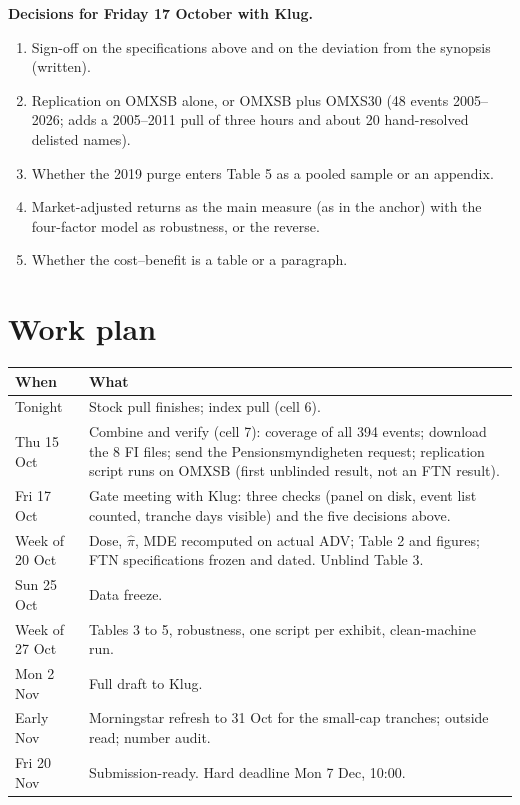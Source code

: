 \documentclass[11pt,a4paper]{article}
\begin{document}
\textbf{Decisions for Friday 17 October with Klug.}
\begin{enumerate}[nosep]
\item Sign-off on the specifications above and on the deviation from the synopsis (written).
\item Replication on OMXSB alone, or OMXSB plus OMXS30 (48 events 2005--2026; adds a 2005--2011 pull of three hours and about 20 hand-resolved delisted names).
\item Whether the 2019 purge enters Table 5 as a pooled sample or an appendix.
\item Market-adjusted returns as the main measure (as in the anchor) with the four-factor model as robustness, or the reverse.
\item Whether the cost--benefit is a table or a paragraph.
\end{enumerate}

\section{Work plan}

\begin{table}[h]
\centering\small
\begin{tabular}{@{}p{3.2cm}p{11.8cm}@{}}
\toprule
When & What \\
\midrule
Tonight & Stock pull finishes; index pull (cell 6). \\
Thu 15 Oct & Combine and verify (cell 7): coverage of all 394 events; download the 8 FI files; send the Pensionsmyndigheten request; replication script runs on OMXSB (first unblinded result, not an FTN result). \\
Fri 17 Oct & Gate meeting with Klug: three checks (panel on disk, event list counted, tranche days visible) and the five decisions above. \\
Week of 20 Oct & Dose, $\hat\pi$, MDE recomputed on actual ADV; Table 2 and figures; FTN specifications frozen and dated. Unblind Table 3. \\
Sun 25 Oct & Data freeze. \\
Week of 27 Oct & Tables 3 to 5, robustness, one script per exhibit, clean-machine run. \\
Mon 2 Nov & Full draft to Klug. \\
Early Nov & Morningstar refresh to 31 Oct for the small-cap tranches; outside read; number audit. \\
Fri 20 Nov & Submission-ready. Hard deadline Mon 7 Dec, 10:00. \\
\bottomrule
\end{tabular}
\end{table}
\end{document}
